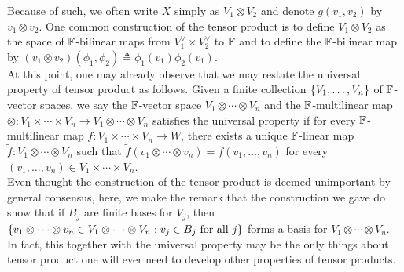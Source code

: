 \documentclass{report}
\begin{document}
Because of such, we often write $X$ simply as  $V_1 \otimes V_2$ and denote $g(v_1,v_2)$ by $v_1 \otimes  v_2$. One common construction of the tensor product is to define  $V_1 \otimes  V_2$ as the space of $\mathbb{F}$-bilinear maps from  $V_1^\vee\times V_2^\vee$ to $\mathbb{F}$ and to define the $\mathbb{F}$-bilinear map by $(v_1\otimes  v_2)(\phi_1, \phi_2)\triangleq \phi_1(v_1) \phi_2(v_1)$. \\

At this point, one may already observe that we may restate the universal property of tensor product as follows. Given a finite collection $\left\{ V_1,\dots ,V_n \right\}$ of $\mathbb{F}$-vector spaces, we say the $\mathbb{F}$-vector space $V_1\otimes  \cdots \otimes  V_n$ and the $\mathbb{F}$-multilinear map $\otimes  :V_1\times \cdots \times V_n \rightarrow V_1 \otimes  \cdots \otimes  V_n$ satisfies the universal property if for every $\mathbb{F}$-multilinear map  $f:V_1\times \cdots \times V_n \rightarrow W$, there exists a unique $\mathbb{F}$-linear map  $\tilde{f}:V_1 \otimes  \cdots \otimes  V_n$ such that $\tilde{f}(v_1\otimes  \cdots \otimes  v_n)=f(v_1,\dots ,v_n)$ for every  $(v_1,\dots ,v_n)\in V_1 \times \cdots \times V_n$.  \\

Even thought the construction of the tensor product is deemed unimportant by general consensus, here, we make the remark that the construction we gave do show that if $B_j$ are finite bases for $V_j$, then  $\left\{ v_1\otimes \cdots \otimes  v_n \in V_1 \otimes  \cdots \otimes  V_n: v_j \in B_j\text{ for all }j \right\}$ forms a basis for $V_1\otimes  \cdots \otimes  V_n$. In fact, this together with the universal property may be the only things about tensor product one will ever need to develop other properties of tensor products. 
\end{document}
